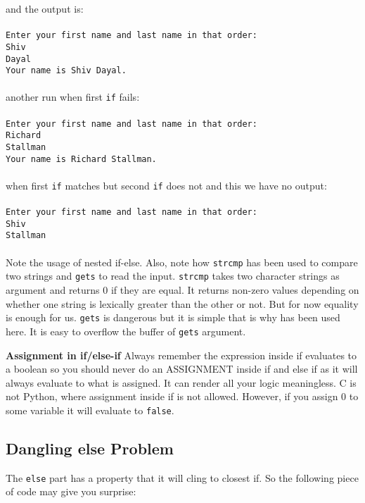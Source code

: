 and the output is:
\\\\\texttt{Enter your first name and last name in that order:\\
Shiv\\
Dayal\\
Your name is Shiv Dayal.\\\\}
another run when first \texttt{if} fails:
\\\\\texttt{Enter your first name and last name in that order:\\
Richard\\
Stallman\\
Your name is Richard Stallman.\\\\}
when first \texttt{if} matches but second \texttt{if} does not and this we have no output:
\\\\\texttt{Enter your first name and last name in that order:\\
Shiv\\
Stallman\\\\}
Note the usage of nested if-else. Also, note how \texttt{strcmp} has been used to
compare two strings and \texttt{gets} to read the input. \texttt{strcmp} takes two character
strings as argument and returns 0 if they are equal. It returns non-zero values
depending on whether one string is lexically greater than the other or not. But
for now equality is enough for us. \texttt{gets} is dangerous but it is simple that is
why has been used here. It is easy to overflow the buffer of \texttt{gets} argument.

\color{nicered}
\dangersign[3ex] \textbf{Assignment in if/else-if}
Always remember the expression inside if evaluates to a boolean so you should
never do an ASSIGNMENT inside if and else if as it will always evaluate to what
is assigned. It can render all your logic meaningless. C is not Python, where
assignment inside if is not allowed. However, if you assign 0 to some variable
it will evaluate to \texttt{false}.

\color{black}
\subsection{Dangling else Problem}
The \texttt{else} part has a property that it will cling to closest if. So the
following piece of code may give you surprise:

